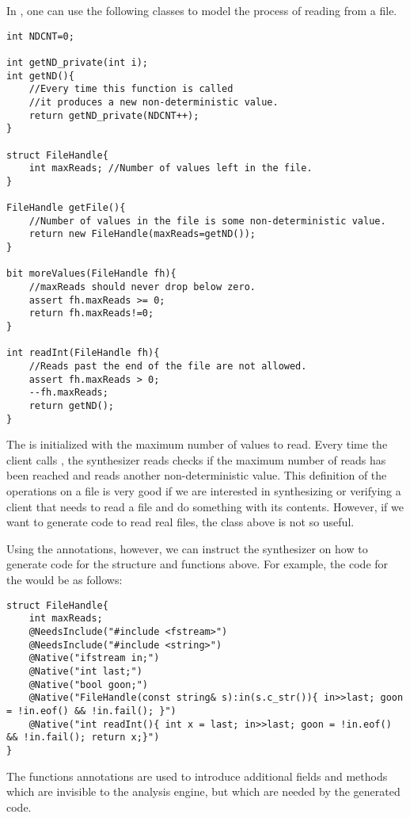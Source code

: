\begin{Example}
In \Sk{}, one can use the following classes to model the process of reading from a file.

\begin{lstlisting}
int NDCNT=0;

int getND_private(int i);
int getND(){
    //Every time this function is called
    //it produces a new non-deterministic value.
    return getND_private(NDCNT++);
}

struct FileHandle{
    int maxReads; //Number of values left in the file.
}

FileHandle getFile(){
    //Number of values in the file is some non-deterministic value.
    return new FileHandle(maxReads=getND());
}

bit moreValues(FileHandle fh){
    //maxReads should never drop below zero.
    assert fh.maxReads >= 0; 
    return fh.maxReads!=0;
}

int readInt(FileHandle fh){
    //Reads past the end of the file are not allowed.
    assert fh.maxReads > 0;
    --fh.maxReads; 
    return getND();
}
\end{lstlisting}

The  is initialized with the maximum number of values to read. Every time the client calls , the synthesizer reads checks if the maximum number of reads has been reached and reads another non-deterministic value. This definition of the operations on a file is very good if we are interested in synthesizing or verifying a client that needs to read a file and do something with its contents. However, if we want to generate code to read real files, the class above is not so useful. 

Using the  annotations, however, we can instruct the synthesizer on how to generate code for the structure and functions above. For example, the code for the  would be as follows:

\begin{lstlisting}
struct FileHandle{
    int maxReads;
    @NeedsInclude("#include <fstream>")
    @NeedsInclude("#include <string>")
    @Native("ifstream in;")
    @Native("int last;")
    @Native("bool goon;")
    @Native("FileHandle(const string& s):in(s.c_str()){ in>>last; goon = !in.eof() && !in.fail(); }")
    @Native("int readInt(){ int x = last; in>>last; goon = !in.eof() && !in.fail(); return x;}")
}
\end{lstlisting}
The functions annotations are used to introduce additional fields and methods which are invisible to the analysis engine, but which are needed by the generated code. 


\end{Example}
